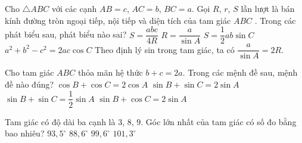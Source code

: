 \begin{ex}
	Cho $\triangle ABC$ với các cạnh $AB=c$, $AC=b$, $BC=a$. Gọi $R$, $r$, $S$ lần lượt là bán kính đường tròn ngoại tiếp, nội tiếp và diện tích của tam giác $ABC$ . Trong các phát biểu sau, phát biểu nào sai?
	\choice
	{$S=\dfrac{abc}{4R}$ }
	{\True $R=\dfrac{a}{\sin A}$ }
	{$S=\dfrac{1}{2}ab\sin C$ }
	{$a^2+b^2-c^2=2ac\cos C$}
	\loigiai
	{
		Theo định lý sin trong tam giác, ta có $\dfrac{a}{\sin A}=2R$.
	}
\end{ex}
\begin{ex}
	Cho tam giác $ABC$ thỏa mãn hệ thức $b+c=2a$. Trong các mệnh đề sau, mệnh đề nào đúng?
	\choice
	{$\cos B+\cos C=2\cos A$}
	{\True $\sin B+\sin C=2\sin A$}
	{$\sin B+\sin C=\dfrac{1}{2}\sin A$}
	{$\sin B+\cos C=2\sin A$}
\end{ex}
\begin{ex}
	Tam giác có độ dài ba cạnh là $3$, $8$, $9$. Góc lớn nhất của tam giác có số đo bằng bao nhiêu?
	\choice
	{$93{,}5^\circ$}
	{$88{,}6^\circ$}
	{\True $99{,}6^\circ$}
	{$101{,}3^\circ$}
\end{ex}

